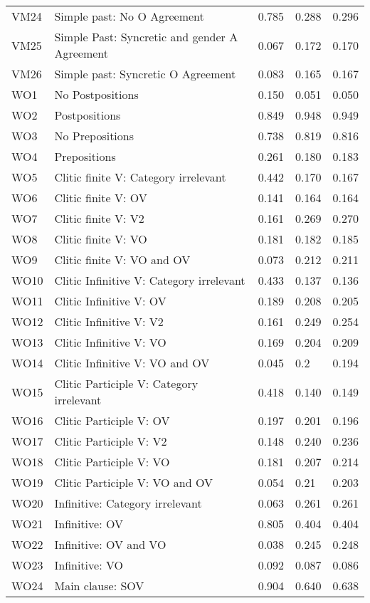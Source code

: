 \begin{longtable}{lllll}
VM24 & Simple past: No O Agreement & 0.785 & 0.288 & 0.296\\
VM25 & Simple Past: Syncretic and gender A Agreement & 0.067 & 0.172 & 0.170\\
VM26 & Simple past: Syncretic O Agreement & 0.083 & 0.165 & 0.167\\
WO1 & No Postpositions & 0.150 & 0.051 & 0.050\\
WO2 & Postpositions & 0.849 & 0.948 & 0.949\\
WO3 & No Prepositions & 0.738 & 0.819 & 0.816\\
WO4 & Prepositions & 0.261 & 0.180 & 0.183\\
WO5 & Clitic finite V: Category irrelevant & 0.442 & 0.170 & 0.167\\
WO6 & Clitic finite V: OV & 0.141 & 0.164 & 0.164\\
WO7 & Clitic finite V: V2 & 0.161 & 0.269 & 0.270\\
WO8 & Clitic finite V: VO & 0.181 & 0.182 & 0.185\\
WO9 & Clitic finite V: VO and OV & 0.073 & 0.212 & 0.211\\
WO10 & Clitic Infinitive V: Category irrelevant & 0.433 & 0.137 & 0.136\\
WO11 & Clitic Infinitive V: OV & 0.189 & 0.208 & 0.205\\
WO12 & Clitic Infinitive V: V2 & 0.161 & 0.249 & 0.254\\
WO13 & Clitic Infinitive V: VO & 0.169 & 0.204 & 0.209\\
WO14 & Clitic Infinitive V: VO and OV & 0.045 & 0.2 & 0.194\\
WO15 & Clitic Participle V: Category irrelevant & 0.418 & 0.140 & 0.149\\
WO16 & Clitic Participle V: OV & 0.197 & 0.201 & 0.196\\
WO17 & Clitic Participle V: V2 & 0.148 & 0.240 & 0.236\\
WO18 & Clitic Participle V: VO & 0.181 & 0.207 & 0.214\\
WO19 & Clitic Participle V: VO and OV & 0.054 & 0.21 & 0.203\\
WO20 & Infinitive: Category irrelevant & 0.063 & 0.261 & 0.261\\
WO21 & Infinitive: OV & 0.805 & 0.404 & 0.404\\
WO22 & Infinitive: OV and VO & 0.038 & 0.245 & 0.248\\
WO23 & Infinitive: VO & 0.092 & 0.087 & 0.086\\
WO24 & Main clause: SOV & 0.904 & 0.640 & 0.638\\

\end{longtable}
